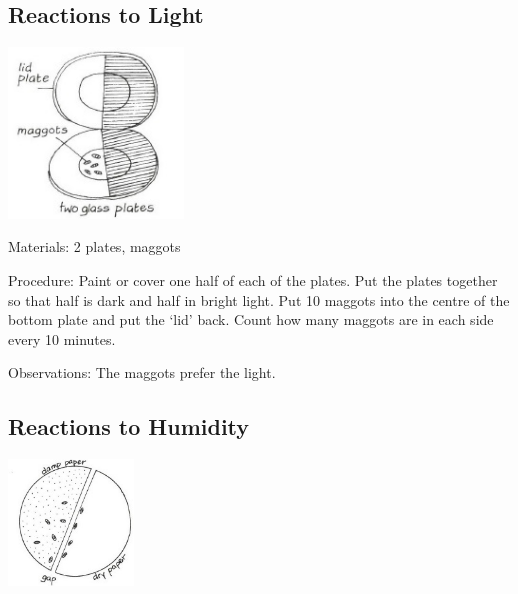 \begin{multicols}{2}
\subsection{Reactions to Light} %

\begin{center}
\includegraphics[width=0.35\textwidth]{./img/vso/reactions-light.jpg}
\end{center}

\begin{description*}
\item[Materials:]{2 plates, maggots}
\item[Procedure:]{Paint or cover one half of each of
the plates. Put the plates together
so that half is dark and half in
bright light. Put 10 maggots into
the centre of the bottom plate
and put the `lid' back. Count how
many maggots are in each side
every 10 minutes.}
\item[Observations:]{The maggots prefer the light.}
\end{description*}

\columnbreak

\subsection{Reactions to Humidity} 

\begin{center}
\includegraphics[width=0.25\textwidth]{./img/vso/reactions-humidity.jpg}
\end{center}


\end{multicols}
